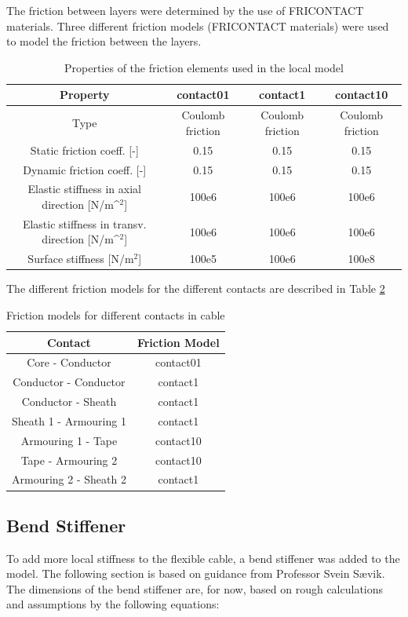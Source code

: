 \noindent The friction between layers were determined by the use of FRICONTACT materials. Three different friction models (FRICONTACT materials) were used to model the friction between the layers. 

\begin{table} [H]
\centering
\begin{tabular}{ |c|c|c|c|}
\hline
Property &contact01 & contact1  & contact10 \\
 \hline
 \hline
Type & Coulomb friction & Coulomb friction & Coulomb friction\\
Static friction coeff. [-] & 0.15 & 0.15 & 0.15\\
Dynamic friction coeff. [-] & 0.15 & 0.15 & 0.15\\
Elastic stiffness in axial direction [N/m^$^2$] & 100e6 & 100e6 & 100e6 \\
Elastic stiffness in transv. direction [N/m^$^2$]& 100e6 & 100e6 & 100e6 \\
Surface stiffness [N/m$^2$] & 100e5 & 100e6 & 100e8\\
 \hline
\end{tabular}
\caption{Properties of the friction elements used in the local model}
\label{table:friprop}
\end{table}

The different friction models for the different contacts are described in Table \ref{table:frimod}

\begin{table} [H]
\centering
\begin{tabular}{ |c|c|}
\hline
Contact & Friction Model  \\
 \hline
 \hline
Core - Conductor & contact01\\
Conductor - Conductor & contact1\\
Conductor - Sheath & contact1\\
Sheath 1 - Armouring 1 & contact1\\
Armouring 1 - Tape &contact10\\
Tape - Armouring 2 &contact10\\
Armouring 2 - Sheath 2 & contact1\\
 \hline
\end{tabular}
\caption{Friction models for different contacts in cable}
\label{table:frimod}
\end{table}

\subsection{Bend Stiffener}
To add more local stiffness to the flexible cable, a bend stiffener was added to the model. The following section is based on guidance from Professor Svein Sævik. 
\newline 
\newline
The dimensions of the bend stiffener are, for now, based on rough calculations and assumptions by the following equations: \newline
\newline

